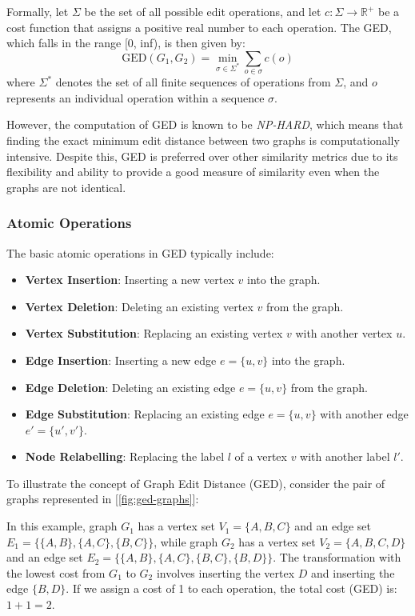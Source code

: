 \documentclass[../Thesis.tex]{subfiles}
\begin{document}
	Formally, let $\Sigma$ be the set of all possible edit operations, and let $c: \Sigma \to \mathbb{R}^+$ be a cost function that assigns a positive real number to each operation. The GED, which falls in the range [0, inf), is then given by:
	\[
	\text{GED}(G_1, G_2) = \min_{\sigma \in \Sigma^*} \sum_{o \in \sigma} c(o)
	\]
	where $\Sigma^*$ denotes the set of all finite sequences of operations from $\Sigma$, and $o$ represents an individual operation within a sequence $\sigma$.
	
	However, the computation of GED is known to be \emph{NP-HARD}, which means that finding the exact minimum edit distance between two graphs is computationally intensive. Despite this, GED is preferred over other similarity metrics due to its flexibility and ability to provide a good measure of similarity even when the graphs are not identical.
	
	\subsubsection{Atomic Operations}
	
	The basic atomic operations in GED typically include:
	
	\begin{itemize}
		\item \textbf{Vertex Insertion}: Inserting a new vertex $v$ into the graph.
		\item \textbf{Vertex Deletion}: Deleting an existing vertex $v$ from the graph.
		\item \textbf{Vertex Substitution}: Replacing an existing vertex $v$ with another vertex $u$.
		\item \textbf{Edge Insertion}: Inserting a new edge $e = \{u, v\}$ into the graph.
		\item \textbf{Edge Deletion}: Deleting an existing edge $e = \{u, v\}$ from the graph.
		\item \textbf{Edge Substitution}: Replacing an existing edge $e = \{u, v\}$ with another edge $e' = \{u', v'\}$.
		\item \textbf{Node Relabelling}: Replacing the label $l$ of a vertex $v$ with another label $l'$.
	\end{itemize}
	
	To illustrate the concept of Graph Edit Distance (GED), consider the pair of graphs represented in [\autoref{fig:ged-graphs}]:
	
	In this example, graph $G_1$ has a vertex set $V_1 = \{A, B, C\}$ and an edge set $E_1 = \{\{A, B\}, \{A, C\}, \{B, C\}\}$, while graph $G_2$ has a vertex set $V_2 = \{A, B, C, D\}$ and an edge set $E_2 = \{\{A, B\}, \{A, C\}, \{B, C\}, \{B, D\}\}$. The transformation with the lowest cost from $G_1$ to $G_2$ involves inserting the vertex $D$ and inserting the edge $\{B, D\}$. If we assign a cost of 1 to each operation, the total cost (GED) is: $1+1=2$.
	
\end{document}

